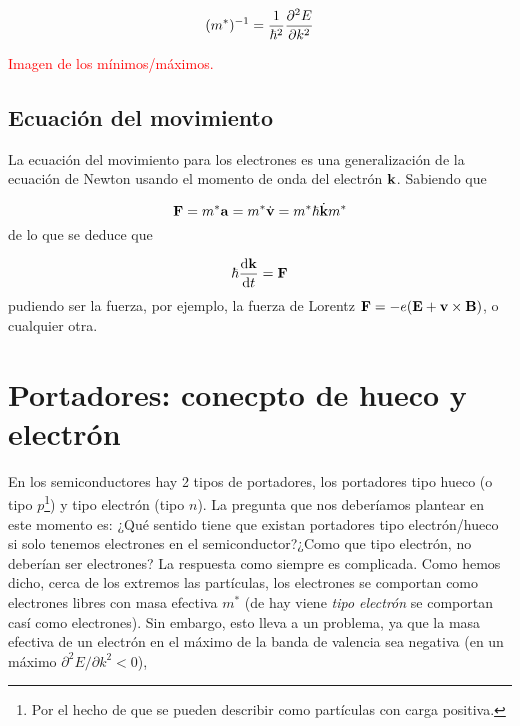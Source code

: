 \begin{equation}
	(m^*)^{-1} = \frac{1}{\hbar^2} \frac{\partial ^2E}{\partial k^2} 
\end{equation}

\begin{Anotacion}
	\textcolor{red}{Imagen de los mínimos/máximos.}
\end{Anotacion}

\subsection{Ecuación del movimiento}

La ecuación del movimiento para los electrones es una generalización de la ecuación de Newton usando el momento de onda del electrón $\mathbf{k}$. Sabiendo que 

\begin{equation}
	\mathbf{F} = m^* \mathbf{a} = m^* \dot{\mathbf{v}} = m^* \hbar \dot{\mathbf{k}}{m^*} 
\end{equation}
de lo que se deduce que 

\begin{equation}
	\hbar \frac{\mathrm{d} \mathbf{k}}{\mathrm{d} t} = \mathbf{F}
\end{equation}
pudiendo ser la fuerza, por ejemplo, la fuerza de Lorentz $\mathbf{F}=-e(\mathbf{E}+\mathbf{v} \times \mathbf{B})$, o cualquier otra.

\section{Portadores: conecpto de hueco y electrón}

En los semiconductores hay 2 tipos de portadores, los portadores tipo hueco (o tipo $p$\footnote{Por el hecho de que se pueden describir como partículas con carga positiva.}) y tipo electrón (tipo $n$). La pregunta que nos deberíamos plantear en este momento es: ¿Qué sentido tiene que existan portadores tipo electrón/hueco si solo tenemos electrones en el semiconductor?¿Como que tipo electrón, no deberían ser electrones? La respuesta como siempre es complicada. Como hemos dicho, cerca de los extremos las partículas, los electrones se comportan como electrones libres con masa efectiva $m^*$ (de hay viene \textit{tipo electrón} se comportan casí como electrones). Sin embargo, esto lleva a un problema, ya que la masa efectiva de un electrón en el máximo de la banda de valencia sea negativa (en un máximo $\partial^2 E/ \partial k^2<0$), 

